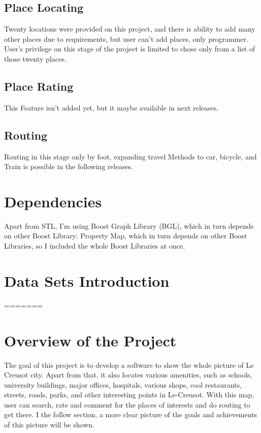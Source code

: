 \documentclass[a4paper, 12pt, english]{book}
\begin{document}
\subsection{Place Locating}
Twenty locations were provided on this project, and there is ability to add many other places due to requirements, but user can't add places, only programmer.
User's privilege on this stage of the project is limited to chose only from a list of those twenty places.
\subsection{Place Rating}
This Feature isn't added yet, but it maybe available in next releases.
\subsection{Routing}
Routing in this stage only by foot, expanding travel Methods to car, bicycle, and Train is possible in the following releases. 
\section{Dependencies}
Apart from STL, I’m using Boost Graph Library (BGL), which in turn depends on other Boost Library: Property Map, which in turn depends on other Boost Libraries, so I included the whole Boost Libraries at once.
\section{Data Sets Introduction}
=======
\section{Overview of the Project}


The goal of this project is to develop a software to show the whole picture of Le Creusot city. Apart from that, it also locates various amenities, such as schools, university buildings, major offices, hospitals, various shops, cool restaurants, streets, roads, parks, and other interesting points in Le-Creusot. With this map, user can search, rate and comment for the places of interests and do routing to get there. I the follow section, a more clear picture of the goals and achievements of this picture will be shown. \\
\end{document}
